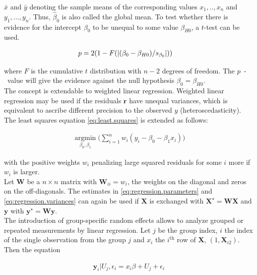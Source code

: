 \documentclass[11pt,a4paper,twoside]{book}\usepackage[]{graphicx}\usepackage[]{color}
\begin{document}
$\bar{x}$ and $\bar{y}$ denoting the sample means of the corresponding values $x_1, .., x_n$ and $y_1, ..., y_n$. Thus, $\hat{\beta}_0$ is also called the global mean.
To test whether there is evidence for the intercept $\beta_0$ to be unequal to some value $\beta_{H0}$, a $t$-test can be used. 

\begin{align}
p &= 2(1-F(\left\lvert(\beta_0 - \beta_{H0})/s_{\beta_0}\right\rvert)) \nonumber
\end{align}

where $F$ is the cumulative $t$ distribution with $n-2$ degrees of freedom. The  $p$\hspace{0.4mm}~-~value will give the evidence against the null hypothesis $\beta_0 = \beta_{H0}$. \\
The concept is extendable to weighted linear regression. Weighted linear regression may be used if the residuals $\mathbf{r}$ have unequal variances, which is equivalent to ascribe different precision to the observed $y$ (heteroscedasticity). The least squares equation \eqref{eq:least.squares} is extended as follows:

\begin{align}
\operatorname*{argmin}_{\beta_0, \beta_1}\Big(\sum_{i = 1}^n w_i(y_i - \beta_0 - \beta_1 x_i)\Big) \nonumber
\end{align}

with the positive weights $w_i$ penalizing large squared residuals for some $i$ more if $w_i$ is larger. \\
Let $\mathbf{W}$ be a $n \times n$ matrix with $\mathbf{W}_{ii} = w_i$, the weights on the diagonal and zeros on the off-diagonals. The estimates in \eqref{eq:regression.parameters} and \eqref{eq:regression.variances} can again be used if $\mathbf{X}$ is exchanged with $\mathbf{X}^\star =  \mathbf{W} \mathbf{X}$ and $\mathbf{y}$ with $\mathbf{y}^\star = \mathbf{W} \mathbf{y}$. \label{weighted.regression} \\
The introduction of group-specific random effects allows to analyze grouped or repeated measurements by linear regression. Let $j$ be the group index, $i$ the index of the single observation from the group $j$ and $x_i$ the $i^\textrm{th}$ row of $\mathbf{X}$, $(1, \mathbf{X}_{i2})$. Then the equation

\begin{align}
\mathbf{y}_i|U_j,\epsilon_{i} =  x_i\beta + U_j + \epsilon_{i} \label{eq:one.random.intercept}
\end{align}
\end{document}
